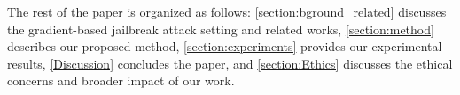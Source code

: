 The rest of the paper is organized as follows: \cref{section:bground_related} discusses the gradient-based jailbreak attack setting and related works, \cref{section:method} describes our proposed method, \cref{section:experiments} provides our experimental results, \cref{Discussion} concludes the paper, and \cref{section:Ethics} discusses the ethical concerns and broader impact of our work. 

%


